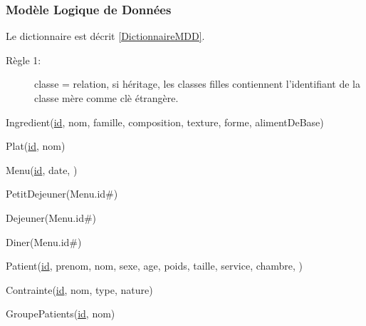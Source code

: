 \subsubsection{Modèle Logique de Données}
Le dictionnaire est décrit \autoref{DictionnaireMDD}.
\begin{description}
\item[Règle 1:] classe = relation, si héritage, les classes filles contiennent l'identifiant de la classe mère comme clè étrangère.
\end{description}

Ingredient(\underline{id}, nom, famille, composition, texture, forme, alimentDeBase)

Plat(\underline{id}, nom)

Menu(\underline{id}, date, )

PetitDejeuner(Menu.id\#)

Dejeuner(Menu.id\#)

Diner(Menu.id\#)

Patient(\underline{id}, prenom, nom, sexe, age, poids, taille, service, chambre, )

Contrainte(\underline{id}, nom, type, nature)

GroupePatients(\underline{id}, nom)






